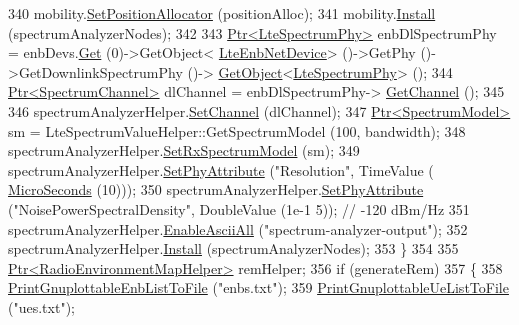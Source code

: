 \begin{DoxyCode}
340       mobility.\hyperlink{classns3_1_1MobilityHelper_ac59d5295076be3cc11021566713a28c5}{SetPositionAllocator} (positionAlloc);
341       mobility.\hyperlink{classns3_1_1MobilityHelper_a07737960ee95c0777109cf2994dd97ae}{Install} (spectrumAnalyzerNodes);
342 
343       \hyperlink{classns3_1_1Ptr}{Ptr<LteSpectrumPhy>} enbDlSpectrumPhy = enbDevs.\hyperlink{classns3_1_1NetDeviceContainer_a677d62594b5c9d2dea155cc5045f4d0b}{Get} (0)->GetObject<
      \hyperlink{classns3_1_1LteEnbNetDevice}{LteEnbNetDevice}> ()->GetPhy ()->GetDownlinkSpectrumPhy ()->
      \hyperlink{classns3_1_1Object_a13e18c00017096c8381eb651d5bd0783}{GetObject}<\hyperlink{classns3_1_1LteSpectrumPhy}{LteSpectrumPhy}> ();
344       \hyperlink{classns3_1_1Ptr}{Ptr<SpectrumChannel>} dlChannel = enbDlSpectrumPhy->
      \hyperlink{classns3_1_1LteSpectrumPhy_a50f13e43568687ee32c5d63e5bf639c2}{GetChannel} ();
345 
346       spectrumAnalyzerHelper.\hyperlink{classns3_1_1SpectrumAnalyzerHelper_a7fb7b79c0706c9aecd427af6c4148031}{SetChannel} (dlChannel);
347       \hyperlink{classns3_1_1Ptr}{Ptr<SpectrumModel>} sm = LteSpectrumValueHelper::GetSpectrumModel (100, bandwidth);
348       spectrumAnalyzerHelper.\hyperlink{classns3_1_1SpectrumAnalyzerHelper_afcfa897fb4c298b02e39ec87717b0b54}{SetRxSpectrumModel} (sm);
349       spectrumAnalyzerHelper.\hyperlink{classns3_1_1SpectrumAnalyzerHelper_a535a79dd9e2fb4293eb9e9e5fcb111ae}{SetPhyAttribute} (\textcolor{stringliteral}{"Resolution"}, TimeValue (
      \hyperlink{group__timecivil_ga17465a639c8d1464e76538afdd78a9f0}{MicroSeconds} (10)));
350       spectrumAnalyzerHelper.\hyperlink{classns3_1_1SpectrumAnalyzerHelper_a535a79dd9e2fb4293eb9e9e5fcb111ae}{SetPhyAttribute} (\textcolor{stringliteral}{"NoisePowerSpectralDensity"}, DoubleValue (1e-1
      5));     \textcolor{comment}{// -120 dBm/Hz}
351       spectrumAnalyzerHelper.\hyperlink{classns3_1_1SpectrumAnalyzerHelper_ad1bb3c14843583ce1227e00758d8ba51}{EnableAsciiAll} (\textcolor{stringliteral}{"spectrum-analyzer-output"});
352       spectrumAnalyzerHelper.\hyperlink{classns3_1_1SpectrumAnalyzerHelper_a64479eb63eb6b5ad5536ee8ecf2c717a}{Install} (spectrumAnalyzerNodes);
353     \}
354 
355   \hyperlink{classns3_1_1Ptr}{Ptr<RadioEnvironmentMapHelper>} remHelper;
356   \textcolor{keywordflow}{if} (generateRem)
357     \{
358       \hyperlink{lena-distributed-ffr_8cc_a7e3aa5272ba032faa7717e0f3ba2f73d}{PrintGnuplottableEnbListToFile} (\textcolor{stringliteral}{"enbs.txt"});
359       \hyperlink{lena-distributed-ffr_8cc_ad818a3dd4c090b8ecaba926e5272c409}{PrintGnuplottableUeListToFile} (\textcolor{stringliteral}{"ues.txt"});

\end{DoxyCode}
